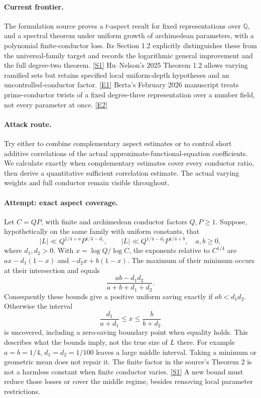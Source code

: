 \documentclass[11pt,a4paper]{article}
\newcommand{\Q}{\mathbb{Q}}
\newcommand{\sref}[2]{\hyperlink{source:#1:#2}{[S#2]}}
\newcommand{\eref}[2]{\hyperlink{extra:#1:#2}{[E#2]}}
\numberwithin{equation}{section}
\begin{document}
\paragraph{Current frontier.}
The formulation source proves a $t$-aspect result for fixed representations
over $\Q$, and a spectral theorem under uniform growth of archimedean
parameters, with a polynomial finite-conductor loss. Its Section 1.2
explicitly distinguishes these from the universal-family target and records
the logarithmic general improvement and the full degree-two theorem.
\sref{statement}{1} Hu--Nelson's 2025 Theorem 1.2 allows varying ramified sets but
retains specified local uniform-depth hypotheses and an uncontrolled-conductor
factor. \eref{statement}{1} Berta's February 2026 manuscript treats prime-conductor
twists of a fixed degree-three representation over a number field, not every
parameter at once. \eref{statement}{2}

\paragraph{Attack route.}
Try either to combine complementary aspect estimates or to control short
additive correlations of the actual approximate-functional-equation
coefficients. We calculate exactly when complementary estimates cover every
conductor ratio, then derive a quantitative sufficient correlation estimate.
The actual varying weights and full conductor remain visible throughout.

\paragraph{Attempt: exact aspect coverage.}
Let $C=QP$, with finite and archimedean conductor factors $Q,P\ge1$. Suppose,
hypothetically on the same family with uniform constants, that
\[
 |L|\ll Q^{1/4+a}P^{1/4-d_1},\qquad
 |L|\ll Q^{1/4-d_2}P^{1/4+b},
 \quad a,b\ge0,
\]
where $d_1,d_2>0$. With $x=\log Q/\log C$, the exponents relative to
$C^{1/4}$ are $ax-d_1(1-x)$ and $-d_2x+b(1-x)$. The maximum of their
minimum occurs at their intersection and equals
\begin{equation}\label{statement:coverage}
 \frac{ab-d_1d_2}{a+b+d_1+d_2}.
\end{equation}
Consequently these bounds give a positive uniform saving exactly if
$ab<d_1d_2$. Otherwise the interval
\[
 \frac{d_1}{a+d_1}\le x\le\frac{b}{b+d_2}
\]
is uncovered, including a zero-saving boundary point when equality holds.
This describes what the bounds imply, not the true size of $L$ there.
For example $a=b=1/4$, $d_1=d_2=1/100$ leaves a large middle interval.
Taking a minimum or geometric mean does not repair it. The finite factor
in the source's Theorem 2 is not a harmless constant when finite conductor
varies. \sref{statement}{1} A new bound must reduce those losses or cover the
middle regime, besides removing local parameter restrictions.
\end{document}
